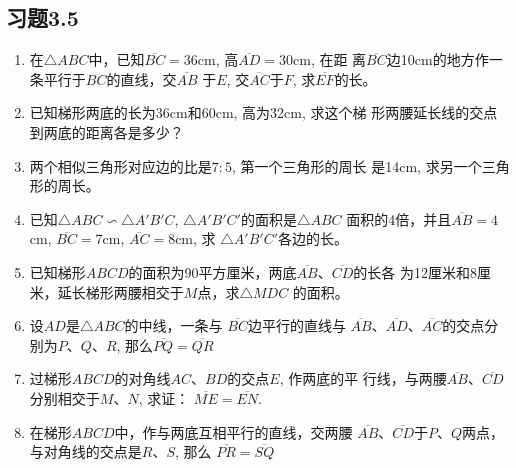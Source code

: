 \subsection*{习题3.5}
\begin{enumerate}
    \item 在$\triangle ABC$中，已知$\overline{BC}=36$cm, 高$\overline{AD}=30$cm, 在距
    离$\overline{BC}$边10cm的地方作一条平行于$BC$的直线，交$\overline{AB}$
    于$E$, 交$\overline{AC}$于$F$, 求$\overline{EF}$的长。
    \item 已知梯形两底的长为36cm和60cm, 高为32cm, 求这个梯
    形两腰延长线的交点到两底的距离各是多少？
    \item 两个相似三角形对应边的比是$7:5$, 第一个三角形的周长
    是14cm, 求另一个三角形的周长。
    \item 已知$\triangle ABC\backsim \triangle A'B'C$, $\triangle A'B'C'$的面积是$\triangle ABC$
    面积的4倍，并且$\overline{AB}=4$cm, $\overline{BC}=7$cm, $\overline{AC}=8$cm, 求
    $\triangle A'B'C'$各边的长。
    \item 已知梯形$ABCD$的面积为90平方厘米，两底$\overline{AB}$、$\overline{CD}$的长各
    为12厘米和8厘米，延长梯形两腰相交于$M$点，求$\triangle MDC$
    的面积。
    \item 设$AD$是$\triangle ABC$的中线，一条与
    $\overline{BC}$边平行的直线与
    $\overline{AB}$、$\overline{AD}$、$\overline{AC}$的交点分别为$P$、$Q$、$R$, 那么$\overline{PQ}=\overline{QR}$
    \item 过梯形$ABCD$的对角线$AC$、$BD$的交点$E$, 作两底的平
    行线，与两腰$\overline{AB}$、$\overline{CD}$分别相交于$M$、$N$, 求证：
    $\overline{ME}=\overline{EN}$.
    \item 在梯形$ABCD$中，作与两底互相平行的直线，交两腰
    $\overline{AB}$、$\overline{CD}$于$P$、$Q$两点，与对角线的交点是$R$、$S$, 那么
    $\overline{PR}=\overline{SQ}$
\end{enumerate}

